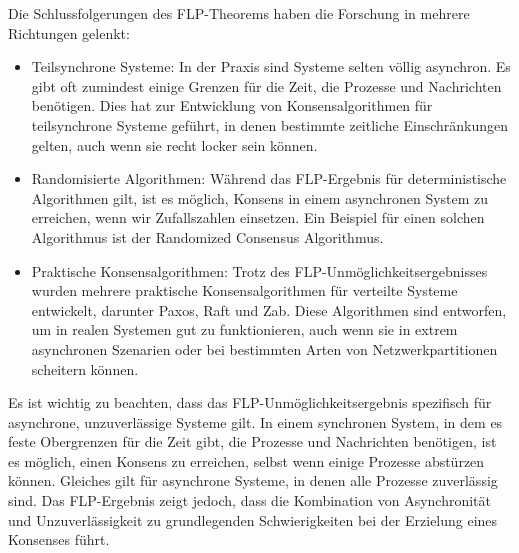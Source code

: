 Die Schlussfolgerungen des FLP-Theorems haben die Forschung in mehrere Richtungen gelenkt:
\begin{itemize}
\item Teilsynchrone Systeme: In der Praxis sind Systeme selten völlig asynchron. Es gibt oft zumindest einige Grenzen für die Zeit, die Prozesse und Nachrichten benötigen. Dies hat zur Entwicklung von Konsensalgorithmen für teilsynchrone Systeme geführt, in denen bestimmte zeitliche Einschränkungen gelten, auch wenn sie recht locker sein können.
\item Randomisierte Algorithmen: Während das FLP-Ergebnis für deterministische Algorithmen gilt, ist es möglich, Konsens in einem asynchronen System zu erreichen, wenn wir Zufallszahlen einsetzen. Ein Beispiel für einen solchen Algorithmus ist der Randomized Consensus Algorithmus.
\item Praktische Konsensalgorithmen: Trotz des FLP-Unmöglichkeitsergebnisses wurden mehrere praktische Konsensalgorithmen für verteilte Systeme entwickelt, darunter Paxos, Raft und Zab. Diese Algorithmen sind entworfen, um in realen Systemen gut zu funktionieren, auch wenn sie in extrem asynchronen Szenarien oder bei bestimmten Arten von Netzwerkpartitionen scheitern können.
\end{itemize}
Es ist wichtig zu beachten, dass das FLP-Unmöglichkeitsergebnis spezifisch für asynchrone, unzuverlässige Systeme gilt. In einem synchronen System, in dem es feste Obergrenzen für die Zeit gibt, die Prozesse und Nachrichten benötigen, ist es möglich, einen Konsens zu erreichen, selbst wenn einige Prozesse abstürzen können. Gleiches gilt für asynchrone Systeme, in denen alle Prozesse zuverlässig sind. Das FLP-Ergebnis zeigt jedoch, dass die Kombination von Asynchronität und Unzuverlässigkeit zu grundlegenden Schwierigkeiten bei der Erzielung eines Konsenses führt.

